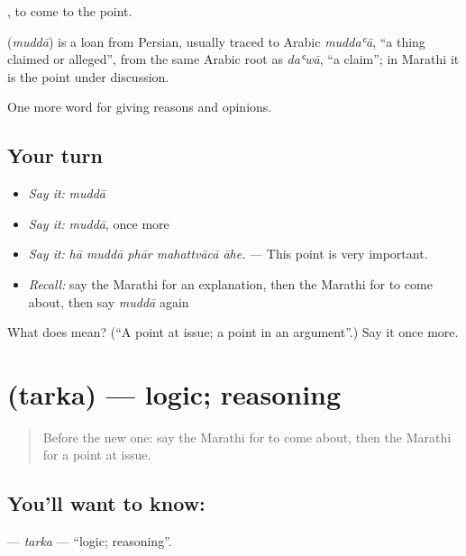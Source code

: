  , to come to the point.

\begin{cousinweb}
\textbf{} (\emph{muddā}) is a loan from Persian, usually traced to Arabic \emph{muddaʿā}, \textquotedblleft{}a thing claimed or alleged\textquotedblright{}, from the same Arabic root as \emph{daʿwā}, \textquotedblleft{}a claim\textquotedblright{}; in Marathi it is the point under discussion.
\end{cousinweb}

\begin{grammarlens}[title={What you've built}]
One more word for giving reasons and opinions.
\end{grammarlens}

\subsection*{Your turn}
\begin{itemize}
\raggedright
  \item \emph{Say it:} \emph{muddā}
  \item \emph{Say it:} \emph{muddā}, once more
  \item \emph{Say it:} \emph{hā muddā phār mahattvācā āhe.} — This point is very important.
  \item \emph{Recall:} say the Marathi for an explanation, then the Marathi for to come about, then say \emph{muddā} again
\end{itemize}

\begin{tcolorbox}[breakable,colback=teal!4,colframe=teal!35!black,title={Before you move on}]
What does  mean? (\textquotedblleft{}A point at issue; a point in an argument\textquotedblright{}.) Say it once more.
\end{tcolorbox}
\section[\texorpdfstring{\mr{तर्क} (tarka)}{तर्क (tarka)}]{ (tarka) — logic; reasoning}

\label{lesson:MR-C343-tarka}



\begin{quote}
Before the new one: say the Marathi for to come about, then the Marathi for a point at issue.
\end{quote}

\subsection*{You'll want to know: }
\textbf{} — \emph{tarka} — \textquotedblleft{}logic; reasoning\textquotedblright{}.

